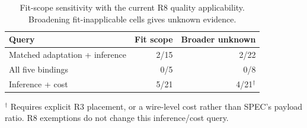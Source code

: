 \begin{table}[t]\centering\footnotesize
\caption{Fit-scope sensitivity with the current R8 quality applicability. Broadening fit-inapplicable cells gives unknown evidence.}\label{tab:r45-current-fit-sensitivity}
\begin{tabularx}{\columnwidth}{@{}Yrr@{}}\toprule
Query & Fit scope & Broader unknown\\\midrule
Matched adaptation + inference & 2/15 & 2/22\\
All five bindings & 0/5 & 0/8\\
\midrule Inference + cost & 5/21 & 4/21$^\dagger$\\
\bottomrule\end{tabularx}
\par\smallskip\raggedright $^\dagger$ Requires explicit R3 placement, or a wire-level cost rather than SPEC's payload ratio. R8 exemptions do not change this inference/cost query.
\end{table}
